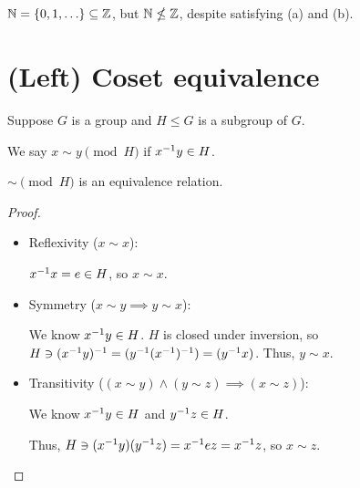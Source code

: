 \documentclass[notes.tex]{subfiles}
\begin{document}
\begin{remark}
	$\mathbb{N} = \{0, 1, \ldots\} \subseteq\mathbb{Z}$, but $\mathbb{N}\nleq\mathbb{Z}$, despite satisfying (a) and (b).
\end{remark}

\chapter*{(Left) Coset equivalence} %

Suppose $G$ is a group and $H\le G$ is a subgroup of $G$. 

\begin{definition}
	We say $x\sim y \pmod H$ if ${x}^{-1} y\in H$.
\end{definition}

\begin{proposition}
	$\sim \pmod H$ is an equivalence relation.
\end{proposition}

\begin{proof}\leavevmode
	\begin{itemize}
		\item Reflexivity ($x\sim x$):

		${x}^{-1} x = e\in H$, so $x\sim x$.

		\item Symmetry ($x\sim y \implies y \sim x$):

		We know ${x}^{-1} y \in H$. $H$ is closed under inversion, so $H \ni ({x}^{-1} y)^{-1} = ({y}^{-1} ({x}^{-1})^{-1}) = ({y}^{-1} x)$. Thus, $y \sim x$.

		\item Transitivity ($(x\sim y) \land(y \sim z) \implies (x\sim z)$):

		We know ${x}^{-1} y \in H$ and ${y}^{-1} z \in H$. 
		
		Thus, $H \ni ({x}^{-1} y)({y}^{-1} z) = {x}^{-1} e z = {x}^{-1} z$, so $x\sim z$.
	\end{itemize}
\end{proof}

\end{document}
